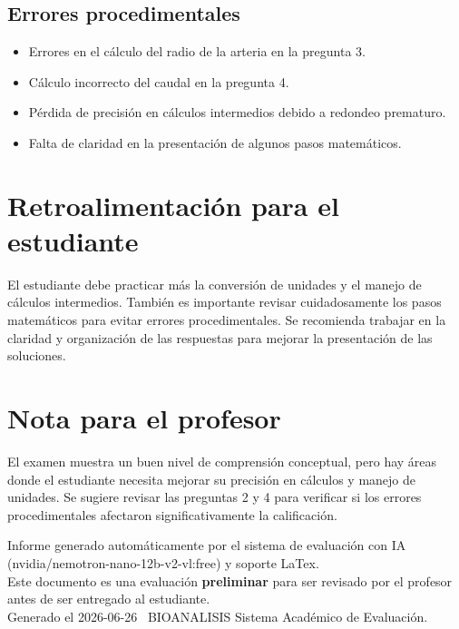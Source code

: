 \documentclass[11pt,a4paper]{article}
\begin{document}
\subsection*{Errores procedimentales}
\begin{itemize}[leftmargin=1.5em, itemsep=2pt]
  \item Errores en el cálculo del radio de la arteria en la pregunta 3.
  \item Cálculo incorrecto del caudal en la pregunta 4.
  \item Pérdida de precisión en cálculos intermedios debido a redondeo prematuro.
  \item Falta de claridad en la presentación de algunos pasos matemáticos.
\end{itemize}

\section*{Retroalimentación para el estudiante}
\begin{tcolorbox}[cajaRecomendacion, title={Dirigido a: krischel bravo 32449538}]
El estudiante debe practicar más la conversión de unidades y el manejo de cálculos intermedios. También es importante revisar cuidadosamente los pasos matemáticos para evitar errores procedimentales. Se recomienda trabajar en la claridad y organización de las respuestas para mejorar la presentación de las soluciones.
\end{tcolorbox}

\section*{Nota para el profesor}
\begin{tcolorbox}[
  enhanced, breakable,
  colback=yellow!8, colframe=yellow!60!black,
  fonttitle=\bfseries, coltitle=black,
  title={Observaciones para revisión manual},
  top=4pt, bottom=4pt, left=8pt, right=8pt,
]
El examen muestra un buen nivel de comprensión conceptual, pero hay áreas donde el estudiante necesita mejorar su precisión en cálculos y manejo de unidades. Se sugiere revisar las preguntas 2 y 4 para verificar si los errores procedimentales afectaron significativamente la calificación.
\end{tcolorbox}

\vspace{12pt}
\begin{center}
  \footnotesize\color{gray}
  Informe generado automáticamente por el sistema de evaluación con IA (nvidia/nemotron-nano-12b-v2-vl:free) y soporte LaTex. \\
  Este documento es una evaluación \textbf{preliminar} para ser revisado por el profesor antes de ser entregado al 
  estudiante. \\
  Generado el 2026-06-26 \textbullet\ BIOANALISIS Sistema Académico de Evaluación.
  \end{center}
\end{document}
